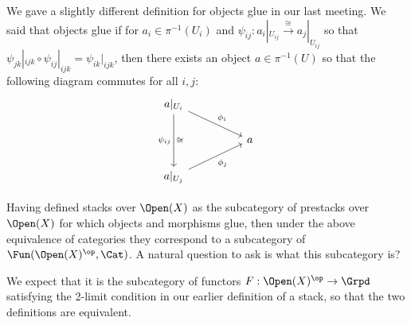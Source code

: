 \begin{remark}
    We gave a slightly different definition for objects glue in our last meeting. We said that objects glue if for $a_i \in \pi^{-1}(U_i)$ and $\psi_{ij}: a_i |_{U_{ij}} \xrightarrow{\cong} a_j |_{U_{ij}}$ so that $\psi_{jk}|_{ijk} \circ \psi_{ij}|_{ijk} = \psi_{ik}|_{ijk}$, then there exists an object $a \in \pi^{-1}(U)$ so that the following diagram commutes for all $i,j$:
    \[\begin{tikzcd}
    	{a |_{U_{i}}} && \\
    	&& a \\
    	{a |_{U_j}}
    	\arrow["{\phi_i}", from=1-1, to=2-3]
    	\arrow["{\psi_{ij}}"', from=1-1, to=3-1]
    	\arrow["\cong", draw=none, from=1-1, to=3-1]
    	\arrow["{\phi_j}"', from=3-1, to=2-3]
    \end{tikzcd}\]
\end{remark}

\begin{question}
    Having defined stacks over $\Open(X)$ as the subcategory of prestacks over $\Open(X)$ for which objects and morphisms glue, then under the above equivalence of categories they correspond to a subcategory of $\Fun(\Open(X)^\op, \Cat)$. A natural question to ask is what this subcategory is?
\end{question}

\begin{answer}
    We expect that it is the subcategory of functors $F: \Open(X)^\op \to \Grpd$ satisfying the 2-limit condition in our earlier definition of a stack, so that the two definitions are equivalent.
\end{answer}

